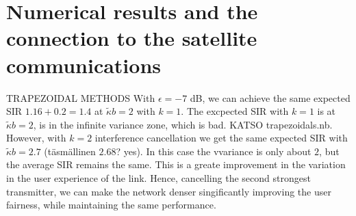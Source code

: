 \documentclass[conference]{IEEEtran}
\theoremstyle{definition}
\theoremstyle{plain}
\begin{document}
          \section{Numerical results and the connection to the satellite communications}
TRAPEZOIDAL METHODS
          With $\epsilon = -7$ dB, we can achieve the same expected SIR $1.16+0.2=1.4$ at $\tilde{\kappa} b= 2$ with $k=1$.  The excpected SIR with $k=1$ is at $\tilde{\kappa} b = 2$, is in the infinite variance zone, which is bad. KATSO trapezoidals.nb. However, with $k=2$ interference cancellation we get the same expected SIR with $\tilde{\kappa}b =2.7$ (täsmällinen $2.68$? yes). In this case the vvariance is  only about $2$, but the average SIR remains the same. This is a greate improvement in the variation in the user experience of the link.  Hence, cancelling the second strongest transmitter, we can make the network denser singificantly improving the user fairness, while maintaining the same performance. 
          
          
          
          

          
         
         
             
             
\end{document}

